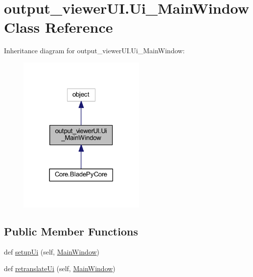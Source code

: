 \hypertarget{a00098}{}\section{output\+\_\+viewer\+U\+I.\+Ui\+\_\+\+Main\+Window Class Reference}
\label{a00098}


Inheritance diagram for output\+\_\+viewer\+U\+I.\+Ui\+\_\+\+Main\+Window\+:\nopagebreak
\begin{figure}[H]
\begin{center}
\leavevmode
\includegraphics[width=177pt]{a00097}
\end{center}
\end{figure}
\subsection*{Public Member Functions}
\begin{DoxyCompactItemize}
\item 
def \hyperlink{a00098_a2a9ce5c092ffe5a4e4cabb341be7ceb4}{setup\+Ui} (self, \hyperlink{a00057_a95763e93bffcc3d9bda7ae977c5c2c4e}{Main\+Window})
\item 
def \hyperlink{a00098_a96efd9219a406e801e268b7add32cb78}{retranslate\+Ui} (self, \hyperlink{a00057_a95763e93bffcc3d9bda7ae977c5c2c4e}{Main\+Window})
\end{DoxyCompactItemize}
